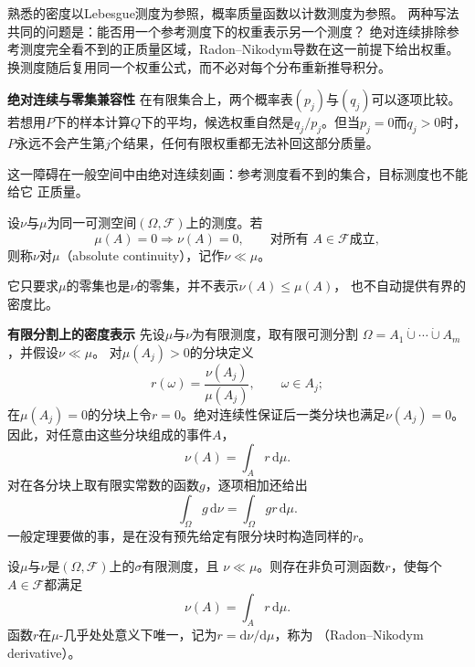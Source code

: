 熟悉的密度以Lebesgue测度为参照，概率质量函数以计数测度为参照。
两种写法共同的问题是：能否用一个参考测度下的权重表示另一个测度？
绝对连续排除参考测度完全看不到的正质量区域，Radon--Nikodym导数在这一前提下给出权重。
换测度随后复用同一个权重公式，而不必对每个分布重新推导积分。

\par\medskip\noindent\textbf{绝对连续与零集兼容性}\quad
在有限集合上，两个概率表\((p_j)\)与\((q_j)\)可以逐项比较。若想用\(P\)下的样本计算\(Q\)下的平均，候选权重自然是\(q_j/p_j\)。但当\(p_j=0\)而\(q_j>0\)时，
\(P\)永远不会产生第\(j\)个结果，任何有限权重都无法补回这部分质量。

这一障碍在一般空间中由绝对连续刻画：参考测度看不到的集合，目标测度也不能给它
正质量。
\begin{definition}[测度的绝对连续]
\label{def:probability-absolute-continuity}
设\(\nu\)与\(\mu\)为同一可测空间\((\Omega,\mathcal{F})\)上的测度。若
\[ \mu(A)=0\Longrightarrow\nu(A)=0,
  \qquad\text{对所有 }A\in\mathcal{F}\text{成立}, \]
则称\(\nu\)对\(\mu\)（absolute continuity），记作\(\nu\ll\mu\)。
\end{definition}
它只要求\(\mu\)的零集也是\(\nu\)的零集，并不表示\(\nu(A)\leq\mu(A)\)，
也不自动提供有界的密度比。

\par\medskip\noindent\textbf{有限分割上的密度表示}\quad
先设\(\mu\)与\(\nu\)为有限测度，取有限可测分割
\(\Omega=A_1\mathbin{\dot\cup}\cdots\mathbin{\dot\cup}A_m\)，并假设\(\nu\ll\mu\)。
对\(\mu(A_j)>0\)的分块定义
\[ r(\omega)=\frac{\nu(A_j)}{\mu(A_j)},
  \qquad \omega\in A_j; \]
在\(\mu(A_j)=0\)的分块上令\(r=0\)。绝对连续性保证后一类分块也满足\(\nu(A_j)=0\)。因此，对任意由这些分块组成的事件\(A\)，
\[ \nu(A)=\int_A r\,\mathrm{d}\mu. \]
对在各分块上取有限实常数的函数\(g\)，逐项相加还给出
\begin{equation}
  \int_{\Omega}g\,\mathrm{d}\nu
  =
  \int_{\Omega}gr\,\mathrm{d}\mu.
  \label{eq:probability-finite-change-measure}
\end{equation}
一般定理要做的事，是在没有预先给定有限分块时构造同样的\(r\)。

\begin{theorem}
\label{thm:probability-radon-nikodym}
设\(\mu\)与\(\nu\)是\((\Omega,\mathcal{F})\)上的\(\sigma\)有限测度，且
\(\nu\ll\mu\)。则存在非负可测函数\(r\)，使每个\(A\in\mathcal{F}\)都满足
\begin{equation}
  \nu(A)=\int_A r\,\mathrm{d}\mu.
  \label{eq:probability-rn-representation}
\end{equation}
函数\(r\)在\(\mu\)-几乎处处意义下唯一，记为\(r=\mathrm{d}\nu/\mathrm{d}\mu\)，称为
（Radon--Nikodym derivative）。
\end{theorem}


